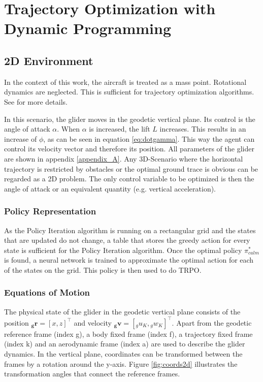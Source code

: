 \chapter{Trajectory Optimization with Dynamic Programming}
\label{chapter5}
\section{2D Environment}

In the context of this work, the aircraft is treated as a mass point. Rotational dynamics are neglected. This is sufficient for trajectory optimization algorithms. See \cite{Fichter2009} for more details. 


In this scenario, the glider moves in the geodetic vertical plane. Its control is the angle of attack $\alpha$. When $\alpha$ is increased, the lift $L$ increases. This results in an increase of $\phi$, as can be seen in equation \ref{eq:dotgamma}. This way the agent can control its velocity vector and therefore its position. All parameters of the glider are shown in appendix \ref{appendix_A}. Any 3D-Scenario where the horizontal trajectory is restricted by obstacles or the optimal ground trace is obvious can be regarded as a 2D problem. The only control variable to be optimized is then the angle of attack or an equivalent quantity (e.g. vertical acceleration).

\subsection{Policy Representation}

As the Policy Iteration algorithm is running on a rectangular grid and the states that are updated do not change, a table that stores the greedy action for every state is sufficient for the Policy Iteration algorithm. Once the optimal policy $\pi_{calm}^*$ is found, a neural network is trained to approximate the optimal action for each of the states on the grid. This policy is then used to do TRPO.

\subsection{Equations of Motion}

The physical state of the glider in the geodetic vertical plane consists of the position $\boldsymbol{{}_g r}=[x,z]^\top$ and velocity $\boldsymbol{{}_g v}=[{}_g u_K,{}_g w_K]^\top$. Apart from the geodetic reference frame (index g), a body fixed frame (index f), a trajectory fixed frame (index k) and an aerodynamic frame (index a) are used to describe the glider dynamics. In the vertical plane, coordinates can be transformed between the frames by a rotation around the y-axis. Figure \ref{fig:coords2d} illustrates the transformation angles that connect the reference frames. 

